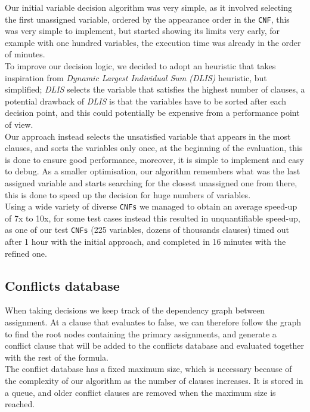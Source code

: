 \documentclass[a4paper]{article}
\begin{document}
Our initial variable decision algorithm was very simple, as it involved selecting the first unassigned variable, ordered by the appearance order in the \texttt{CNF}, this was very simple to implement, but started showing its limits very early, for example with one hundred variables, the execution time was already in the order of minutes. \\
To improve our decision logic, we decided to adopt an heuristic that takes inspiration from \emph{Dynamic Largest Individual Sum (DLIS)} heuristic, but simplified;
\emph{DLIS} selects the variable that satisfies the highest number of clauses, a potential drawback of \emph{DLIS} is that the variables have to be sorted after each decision point, and this could potentially be expensive from a performance point of view. \\
Our approach instead selects the unsatisfied variable that appears in the most clauses, and sorts the variables only once, at the beginning of the evaluation, this is done to ensure good performance, moreover, it is simple to implement and easy to debug.
As a smaller optimisation, our algorithm remembers what was the last assigned variable and starts searching for the closest unassigned one from there, this is done to speed up the decision for huge numbers of variables. \\
Using a wide variety of diverse \texttt{CNFs} we managed to obtain an average speed-up of 7x to 10x, for some test cases instead this resulted in unquantifiable speed-up, as one of our test \texttt{CNFs} (225 variables, dozens of thousands clauses) timed out after 1 hour with the initial approach, and completed in 16 minutes with the refined one.

\subsection{Conflicts database}

When taking decisions we keep track of the dependency graph between assignment. At a clause that evaluates to false, we can therefore follow the graph to find the root nodes containing the primary assignments, and generate a conflict clause that will be added to the conflicts database and evaluated together with the rest of the formula.\\
The conflict database has a fixed maximum size, which is necessary because of the complexity of our algorithm as the number of clauses increases. It is stored in a queue, and older conflict clauses are removed when the maximum size is reached.
\end{document}

